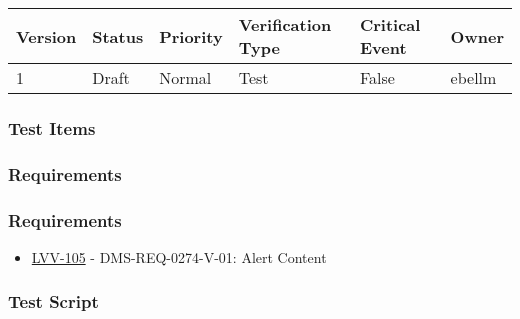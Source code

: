 \begin{longtable}[]{@{}llllll@{}}
\toprule
Version & Status & Priority & Verification Type & Critical Event &
Owner\tabularnewline
\midrule
\endhead
1 & Draft & Normal & Test & False & ebellm\tabularnewline
\bottomrule
\end{longtable}

\hypertarget{test-items}{%
\subsubsection{Test Items}\label{test-items}}

\hypertarget{requirements}{%
\subsubsection{Requirements}\label{requirements}}

\hypertarget{requirements-1}{%
\subsubsection{Requirements}\label{requirements-1}}

\begin{itemize}
\tightlist
\item
  \href{https://jira.lsstcorp.org/browse/LVV-105}{LVV-105} -
  DMS-REQ-0274-V-01: Alert Content
\end{itemize}

\hypertarget{test-script}{%
\subsubsection{Test Script}\label{test-script}}


